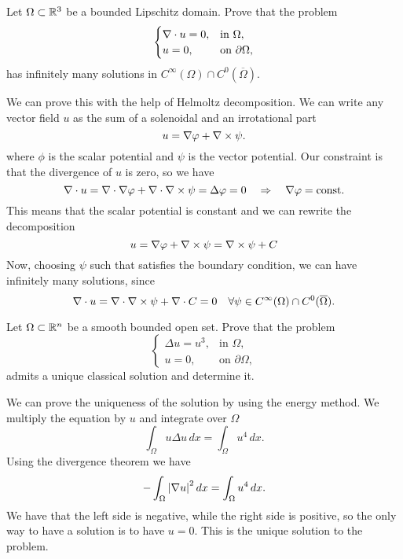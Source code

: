 \newpage
\begin{exercise}
    Let \(\Omega \subset \mathbb{R}^3\) be a bounded Lipschitz domain. Prove that the problem
    \begin{equation*}
        \begin{cases}
            \nabla \cdot u = 0, & \text{in } \Omega,          \\
            u  = 0,            & \text{on } \partial \Omega,
        \end{cases}
    \end{equation*}
    has infinitely many solutions in \(C^\infty(\Omega) \cap C^0(\overline{\Omega})\).
\end{exercise}
We can prove this with the help of Helmoltz decomposition. We can write any vector field \(u\) as the sum of a solenoidal and an irrotational part
\[
    u = \nabla \varphi + \nabla \times \psi.
\]
where \(\phi\) is the scalar potential and \(\psi\) is the vector potential.
Our constraint is that the divergence of \(u\) is zero, so we have
\[
    \nabla \cdot u = \nabla \cdot \nabla \varphi + \nabla \cdot \nabla \times \psi = \Delta \varphi = 0 \quad \Rightarrow \quad \nabla \varphi = \text{const.}
\]
This means that the scalar potential is constant and we can rewrite the
decomposition
\[
    u = \nabla \varphi + \nabla \times \psi = \nabla \times \psi + C
\]
Now, choosing \(\psi\) such that satisfies the boundary condition, we can have
infinitely many solutions, since
\[
    \nabla \cdot u = \nabla \cdot \nabla \times \psi + \nabla \cdot C = 0 \quad \forall \psi \in  C^\infty(\Omega) \cap C^0(\overline{\Omega}).
\]

\newpage
\begin{exercise}
    Let \(\Omega \subset \mathbb{R}^n\) be a smooth bounded open set. Prove that the problem
    \begin{equation*}
        \begin{cases}
            \Delta u = u^3, & \text{in } \Omega,          \\
            u = 0,          & \text{on } \partial \Omega,
        \end{cases}
    \end{equation*}
    admits a unique classical solution and determine it.
\end{exercise}
We can prove the uniqueness of the solution by using the energy method. We multiply the equation by \(u\) and integrate over \(\Omega\)
\[
    \int_\Omega u \Delta u \, dx = \int_\Omega u^4 \, dx.
\]
Using the divergence theorem we have
\[
    -\int_\Omega \abs{\nabla u}^2 \, dx = \int_\Omega u^4 \, dx.
\]
We have that the left side is negative, while the right side is positive, so
the only way to have a solution is to have \(u = 0\). This is the unique
solution to the problem.

